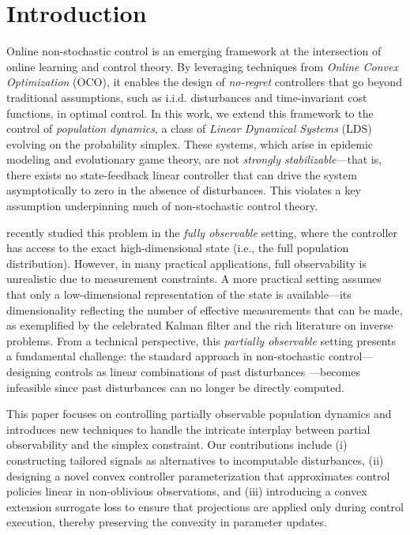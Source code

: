 
\section{Introduction}

Online non-stochastic control \citep{agarwal2019online,hazan2020nonstochastic,hazan2022introduction} is an emerging framework at the intersection of online learning and control theory. By leveraging techniques from \emph{Online Convex Optimization} (OCO), it enables the design of \emph{no-regret} controllers that go beyond traditional assumptions, such as i.i.d. disturbances and time-invariant cost functions, in optimal control. In this work, we extend this framework to the control of \emph{population dynamics}, a class of \emph{Linear Dynamical Systems} (LDS) evolving on the probability simplex. These systems, which arise in epidemic modeling and evolutionary game theory, are not \emph{strongly stabilizable}—that is, there exists no state-feedback linear controller that can drive the system asymptotically to zero in the absence of disturbances. This violates a key assumption underpinning much of non-stochastic control theory. 

\cite{golowich2024online} recently studied this problem in the \emph{fully observable} setting, where the controller has access to the exact high-dimensional state (i.e., the full population distribution). However, in many practical applications, full observability is unrealistic due to measurement constraints. A more practical setting assumes that only a low-dimensional representation of the state is available—its dimensionality reflecting the number of effective measurements that can be made, as exemplified by the celebrated Kalman filter \citep{kalman1960new} and the rich literature on inverse problems. From a technical perspective, this \emph{partially observable} setting presents a fundamental challenge: the standard approach in non-stochastic control—designing controls as linear combinations of past disturbances \citep{hazan2022introduction}—becomes infeasible since past disturbances can no longer be directly computed.

This paper focuses on controlling partially observable population dynamics and introduces new techniques to handle the intricate interplay between partial observability and the simplex constraint. Our contributions include (i) constructing tailored signals as alternatives to incomputable disturbances, (ii) designing a novel convex controller parameterization that approximates control policies linear in non-oblivious observations, and (iii) introducing a convex extension surrogate loss to ensure that projections are applied only during control execution, thereby preserving the convexity in parameter updates.

